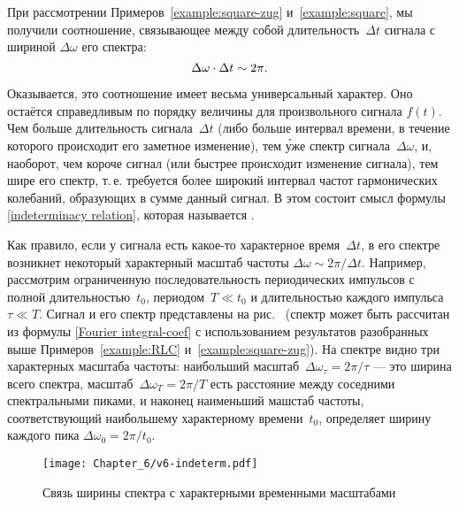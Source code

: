 При рассмотрении Примеров~\ref{example:square-zug} и~\ref{example:square},
мы получили соотношение, связывающее между собой
длительность~$\Delta t$ сигнала с шириной $\Delta \omega$ его спектра:
\begin{equation}
    \eqmark{indeterminacy relation}
    \Delta\omega \cdot \Delta t \sim 2\pi.
\end{equation}

Оказывается, это соотношение имеет весьма универсальный характер.
Оно остаётся справедливым по порядку величины для произвольного сигнала $f(t)$.
Чем больше длительность сигнала~$\Delta t$ (либо больше интервал времени,
в течение которого происходит его заметное изменение), тем \'{у}же спектр
сигнала~$\Delta\omega$, и, наоборот, чем короче сигнал (или быстрее происходит
изменение сигнала), тем шире его спектр, т.\,е. требуется более широкий интервал
частот гармонических колебаний, образующих в сумме данный сигнал.
В этом состоит смысл формулы \eqref{indeterminacy relation},
которая называется .

Как правило, если у сигнала есть какое-то характерное время~$\Delta t$,
в его спектре возникнет некоторый характерный масштаб
частоты $\Delta \omega \sim 2\pi / \Delta t$. Например, рассмотрим ограниченную
последовательность периодических импульсов с полной длительностью~$t_0$,
периодом~$T\ll t_0$ и длительностью каждого импульса~$\tau\ll T$.
Сигнал и его спектр представлены на рис.~
(спектр может быть рассчитан из формулы \eqref{Fourier integral-coef}
с использованием результатов разобранных выше Примеров~\ref{example:RLC}
и~\ref{example:square-zug}). На спектре видно три характерных масштаба частоты:
наибольший масштаб~$\Delta \omega_{\tau} = 2\pi/\tau$ --- это ширина всего спектра,
масштаб~$\Delta \omega_T = 2\pi / T$ есть расстояние между соседними
спектральными пиками, и наконец наименьший машстаб частоты,
соответствующий наибольшему характерному времени~$t_0$, 
определяет ширину каждого пика $\Delta \omega_0 = 2\pi /t_0$.


\begin{figure}[h!]
\centering\texttt{[image: Chapter\_6/v6-indeterm.pdf]}
\caption{Связь ширины спектра с характерными временными масштабами}
\end{figure}


